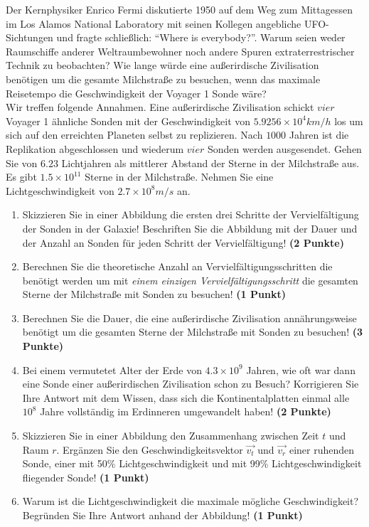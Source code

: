 \documentclass[a4paper, 10pt]{scrartcl}\usepackage[]{graphicx}\usepackage[]{xcolor}
\begin{document}
Der Kernphysiker Enrico Fermi diskutierte 1950 auf dem Weg zum Mittagessen
im Los Alamos National Laboratory mit seinen Kollegen angebliche
UFO-Sichtungen und fragte schlie{\ss}lich: "`Where is everybody?"'. Warum seien
weder Raumschiffe anderer Weltraumbewohner noch andere Spuren
extraterrestrischer Technik zu beobachten? Wie lange w{\"u}rde eine au{\ss}erirdische
Zivilisation ben{\"o}tigen um die gesamte Milchstra{\ss}e zu
besuchen, wenn das maximale Reisetempo die Geschwindigkeit der Voyager 1 Sonde w{\"a}re?\\[-1ex]

Wir treffen folgende Annahmen. Eine au{\ss}erirdische Zivilisation schickt $vier$
Voyager 1 {\"a}hnliche Sonden mit der Geschwindigkeit von $\ensuremath{5.9256\times 10^{4}}km/h$
los um sich auf den erreichten Planeten selbst zu replizieren. Nach
$1000$ Jahren ist die Replikation abgeschlossen und wiederum
$vier$ Sonden werden ausgesendet. Gehen Sie von
$6.23$ Lichtjahren als mittlerer Abstand der Sterne in der
Milchstra{\ss}e aus. Es gibt $\ensuremath{1.5\times 10^{11}}$ Sterne in der Milchstra{\ss}e. Nehmen
Sie eine Lichtgeschwindigkeit von $\ensuremath{2.7\times 10^{8}}m/s$ an.

\begin{enumerate}
\item Skizzieren Sie in einer Abbildung die ersten drei Schritte der
  Vervielf{\"a}ltigung der Sonden in der Galaxie! Beschriften Sie die Abbildung
  mit der Dauer und der Anzahl an Sonden f{\"u}r jeden Schritt der Vervielf{\"a}ltigung! \textbf{(2 Punkte)}
\item Berechnen Sie die theoretische Anzahl an Vervielf{\"a}ltigungsschritten die
  ben{\"o}tigt werden um mit \textit{einem einzigen Vervielf{\"a}ltigungsschritt} die
  gesamten Sterne der Milchstra{\ss}e mit Sonden zu besuchen! \textbf{(1 Punkt)}
\item Berechnen Sie die Dauer, die eine au{\ss}erirdische Zivilisation
  ann{\"a}hrungsweise ben{\"o}tigt um die gesamten Sterne der Milchstra{\ss}e mit
  Sonden zu besuchen! \textbf{(3 Punkte)}
\item Bei einem vermutetet Alter der Erde von $\ensuremath{4.3\times 10^{9}}$ Jahren,
  wie oft war dann eine Sonde einer au{\ss}erirdischen Zivilisation schon zu
  Besuch? Korrigieren Sie Ihre Antwort mit dem Wissen, dass sich die
  Kontinentalplatten einmal alle $\ensuremath{10^{8}}$ Jahre vollst{\"a}ndig im
  Erdinneren umgewandelt haben! \textbf{(2 Punkte)}
\item Skizzieren Sie in einer Abbildung den Zusammenhang zwischen Zeit $t$
  und Raum $r$. Erg{\"a}nzen Sie den Geschwindigkeitsvektor $\vec{v_t}$ und
  $\vec{v_r}$ einer ruhenden Sonde, einer mit 50\% Lichtgeschwindigkeit und
  mit 99\% Lichtgeschwindigkeit fliegender Sonde! \textbf{(1 Punkt)}
\item Warum ist die Lichtgeschwindigkeit die maximale m{\"o}gliche Geschwindigkeit?
Begr{\"u}nden Sie Ihre Antwort anhand der Abbildung!  \textbf{(1 Punkt)}
\end{enumerate}
\end{document}
